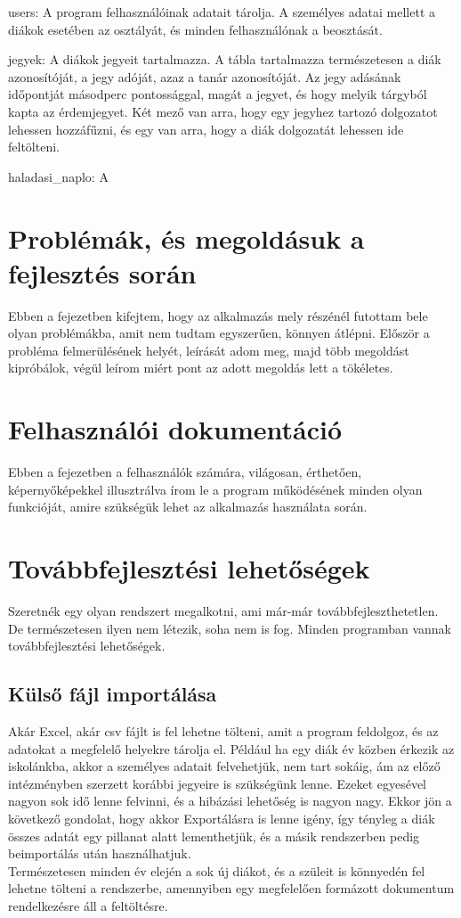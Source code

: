 \documentclass[
]{thesis-ekf}
\begin{document}
 users: A program felhasználóinak adatait tárolja. A személyes adatai mellett a diákok esetében az osztályát, és minden felhasználónak a beosztását.
 
 jegyek: A diákok jegyeit tartalmazza. A tábla tartalmazza természetesen a diák azonosítóját, a jegy adóját, azaz a tanár azonosítóját. Az jegy adásának időpontját másodperc pontossággal, magát a jegyet, és hogy melyik tárgyból kapta az érdemjegyet. Két mező van arra, hogy egy jegyhez tartozó dolgozatot lehessen hozzáfűzni, és egy van arra, hogy a diák dolgozatát lehessen ide feltölteni.
 
 haladasi\_naplo: A
   
\chapter{Problémák, és megoldásuk a fejlesztés során}
Ebben a fejezetben kifejtem, hogy az alkalmazás mely részénél futottam bele olyan problémákba, amit nem tudtam egyszerűen, könnyen átlépni. Először a probléma felmerülésének helyét, leírását adom meg, majd több megoldást kipróbálok, végül leírom miért pont az adott megoldás lett a tökéletes.
\chapter{Felhasználói dokumentáció}
Ebben a fejezetben a felhasználók számára, világosan, érthetően, képernyőképekkel illusztrálva írom le a program működésének minden olyan funkcióját, amire szükségük lehet az alkalmazás használata során.
\chapter{Továbbfejlesztési lehetőségek}
Szeretnék egy olyan rendszert megalkotni, ami már-már továbbfejleszthetetlen. De természetesen ilyen nem létezik, soha nem is fog. Minden programban vannak továbbfejlesztési lehetőségek.
\section{Külső fájl importálása}
Akár Excel, akár csv fájlt is fel lehetne tölteni, amit a program feldolgoz, és az adatokat a megfelelő helyekre tárolja el. Például ha egy diák év közben érkezik az iskolánkba, akkor a személyes adatait felvehetjük, nem tart sokáig, ám az előző intézményben szerzett korábbi jegyeire is szükségünk lenne. Ezeket egyesével nagyon sok idő lenne felvinni, és a hibázási lehetőség is nagyon nagy. Ekkor jön a következő gondolat, hogy akkor Exportálásra is lenne igény, így tényleg a diák összes adatát egy pillanat alatt lementhetjük, és a másik rendszerben pedig beimportálás után használhatjuk.\\
Természetesen minden év elején a sok új diákot, és a szüleit is könnyedén fel lehetne tölteni a rendszerbe, amennyiben egy megfelelően formázott dokumentum rendelkezésre áll a feltöltésre.
\end{document}
